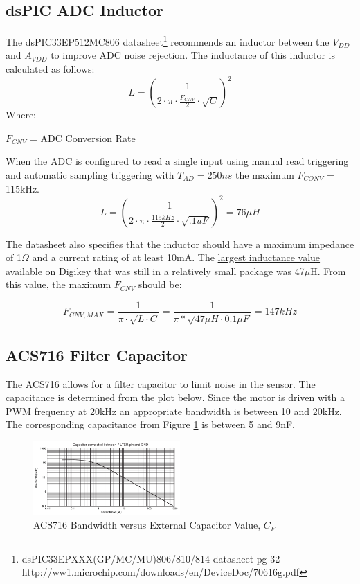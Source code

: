 \documentclass{article}
\begin{document}
\subsection{dsPIC ADC Inductor}
The dsPIC33EP512MC806 datasheet\footnote{\raggedright dsPIC33EPXXX(GP/MC/MU)806/810/814 datasheet pg 32 http://ww1.microchip.com/downloads/en/DeviceDoc/70616g.pdf} 
recommends an inductor between the $V_{DD}$ and $A_{VDD}$ to improve ADC noise rejection. The inductance of this inductor is calculated as follows: 
\[ L = \left(\frac{1}{2\cdot\pi\cdot\frac{F_{CNV}}{2}\cdot\sqrt{C}} \right)^2 \]
Where: 

$F_{CNV}$ = ADC Conversion Rate

When the ADC is configured to read a single input using manual read triggering and automatic sampling triggering with $T_{AD} = 250ns$ the maximum $F_{CONV}$ = 115kHz.
\[L= \left(\frac{1}{2\cdot\pi\cdot\frac{115kHz}{2}\cdot\sqrt{.1uF}} \right)^2 = 76 \mu H\]

The datasheet also specifies that the inductor should have a maximum impedance of 1$\Omega$ and a current rating of at least 10mA. The \href{http://www.digikey.com/product-detail/en/LBC3225T470KR/587-2430-1-ND/2230296}{largest inductance value available on Digikey} that was still in a relatively small package was 47$\mu$H. From this value, the maximum $F_{CNV}$ should be:

\[F_{CNV,MAX} =\frac{1}{\pi \cdot \sqrt{L\cdot C}} = \frac{1}{\pi * \sqrt{47\mu H \cdot0.1 \mu F}}= 147kHz\]

\subsection{ACS716 Filter Capacitor}
The ACS716 allows for a filter capacitor to limit noise in the sensor. The capacitance is determined from the plot below. Since the motor is driven with a PWM frequency at 20kHz an appropriate bandwidth is between 10 and 20kHz. The corresponding capacitance from Figure \ref{fig:filter} is between 5 and 9nF.
\begin{figure}[h]
	\centering
	\includegraphics[width=0.5\textwidth]{acs716filter}
	\caption{ACS716 Bandwidth versus External Capacitor Value, $C_F$\protect\footnotemark}
	\label{fig:filter}
\end{figure}
\end{document}

